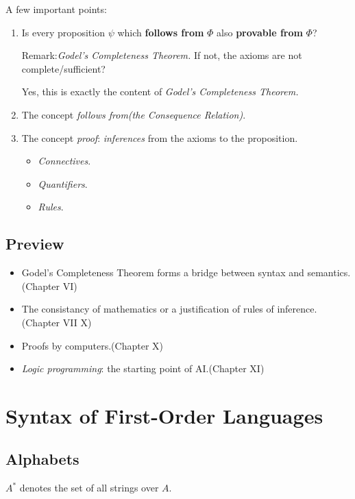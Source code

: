 \documentclass{article}
\begin{document}
A few important points:
\begin{enumerate}
    \item Is every proposition $\psi$ which {\bf follows from} $\Phi$ also {\bf provable from} $\Phi$?
    \begin{freebox}{Remark:\it Godel's Completeness Theorem.}
        If not, the axioms are not complete/sufficient?

        {\color{green}Yes}, this is exactly the content of {\it Godel's Completeness Theorem.}
    \end{freebox}
    \item The concept {\it follows from(the Consequence Relation)}.
    \item The concept {\it proof}: {\it inferences} from the axioms to the proposition.
        \begin{itemize}
            \item {\it Connectives}.
            \item {\it Quantifiers}.
            \item {\it Rules}.
        \end{itemize}
\end{enumerate}

\subsection{Preview}
\begin{itemize}
    \item Godel's Completeness Theorem forms a bridge between syntax and semantics.(Chapter VI)
    \item The consistancy of mathematics or a justification of rules of inference.(Chapter VII X)
    \item Proofs by computers.(Chapter X)
    \item {\it Logic programming}: the starting point of AI.(Chapter XI)
\end{itemize}


\section{Syntax of First-Order Languages}

\subsection{Alphabets}
$A^*$ denotes the set of all strings over $A$.
\end{document}
